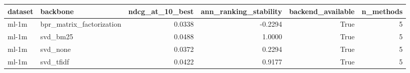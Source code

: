 \begin{tabular}{llrrrr}
\toprule
dataset & backbone & ndcg_at_10_best & ann_ranking_stability & backend_available & n_methods \\
\midrule
ml-1m & bpr_matrix_factorization & 0.0338 & -0.2294 & True & 5 \\
ml-1m & svd_bm25 & 0.0488 & 1.0000 & True & 5 \\
ml-1m & svd_none & 0.0372 & 0.2294 & True & 5 \\
ml-1m & svd_tfidf & 0.0422 & 0.9177 & True & 5 \\
\bottomrule
\end{tabular}
